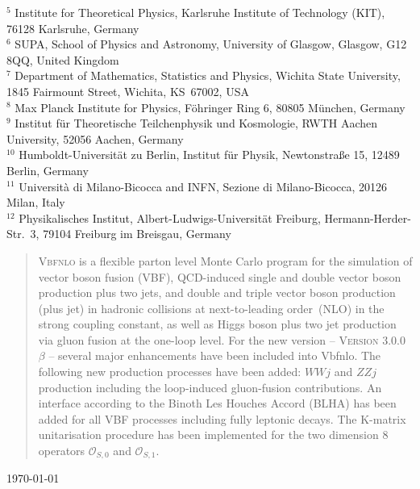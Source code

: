 \documentclass[english,12pt]{article}
\begin{document}
\begin{titlepage}
\begin{center}
$^{5}$ Institute for Theoretical Physics, Karlsruhe Institute of Technology (KIT), 76128 Karlsruhe, Germany \\ \noindent
$^{6}$ SUPA, School of Physics and Astronomy, University of Glasgow, Glasgow, G12 8QQ, United Kingdom \\ \noindent
$^{7}$ Department of Mathematics, Statistics and Physics, Wichita State University, 1845 Fairmount Street, Wichita, KS\ 67002, USA\\ \noindent
$^{8}$ Max Planck Institute for Physics, F\"{o}hringer Ring 6, 80805 M\"{u}nchen, Germany\\ \noindent
$^{9}$ Institut f\"{u}r Theoretische Teilchenphysik und Kosmologie, RWTH Aachen University, 52056 Aachen, Germany  \\ \noindent
$^{10}$ Humboldt-Universit\"{a}t zu Berlin, Institut f\"{u}r Physik, Newtonstra{\ss}e 15, 12489 Berlin, Germany \\ \noindent
$^{11}$ Universit\`a di Milano-Bicocca and INFN, Sezione di Milano-Bicocca, 20126 Milan, Italy\\ \noindent
$^{12}$ Physikalisches Institut, Albert-Ludwigs-Universit\"{a}t Freiburg, Hermann-Herder-Str.\ 3, 79104 Freiburg im Breisgau, Germany \\ \noindent
\noindent
\end{center}
\vspace{0.6cm}

\newpage

\begin{abstract}

\noindent
\textsc{Vbfnlo} is a flexible parton level Monte Carlo program for the
simulation of vector boson fusion (VBF), QCD-induced single and double
vector boson production plus two jets, and double and triple vector
boson production (plus jet) in hadronic collisions at next-to-leading
order~(NLO) in the strong coupling constant, as well as Higgs boson plus
two jet production via gluon fusion at the one-loop level.  For the new
version -- \textsc{Version 3.0.0 $\beta$} -- several major enhancements have
been included into {\sc Vbfnlo}.  The following new production processes have been
added: $WWj$ and $ZZj$ production including the loop-induced gluon-fusion
contributions.
An interface according to the Binoth Les Houches Accord (BLHA) has been added
for all VBF processes including fully leptonic decays.
The K-matrix unitarisation procedure has been implemented for the two dimension
8 operators $\mathcal{O}_{S,0}$ and $\mathcal{O}_{S,1}$. 
\end{abstract}
\vspace{2 cm}
\today
\end{titlepage}
\end{document}
